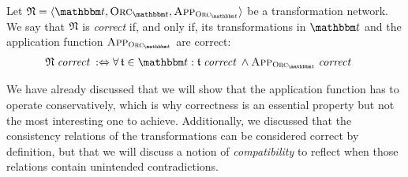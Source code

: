 \begin{definition}
    \label{def:transformationnetworkcorrectness}
    Let $\transformationnetwork{N} = \tupled{\transformationset{T}, \orcfunction{\transformationset{T}}, \appfunction{\orcfunction{\transformationset{T}}}}$ be a transformation network.
    We say that $\transformationnetwork{N}$ is \emph{correct} if, and only if, its transformations in $\transformationset{T}$ and the application function $\appfunction{\orcfunction{\transformationset{T}}}$ are correct:
    \begin{align*}
        & 
       \transformationnetwork{N} \correctmath \equivalentperdefinition
        \forall \transformation{t} \in \transformationset{T} : \transformation{t} \correctmath \land \appfunction{\orcfunction{\transformationset{T}}} \correctmath
    \end{align*}
\end{definition}

We have already discussed that we will show that the application function has to operate conservatively, which is why correctness is an essential property but not the most interesting one to achieve.
Additionally, we discussed that the consistency relations of the transformations can be considered correct by definition, but that we will discuss a notion of \emph{compatibility} to reflect when those relations contain unintended contradictions.


